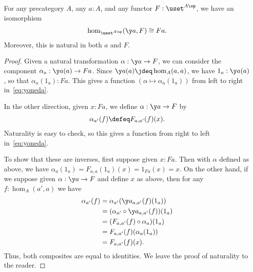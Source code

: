 %
\begin{thm}\label{ct:yoneda}
  For any precategory $A$, any $a:A$, and any functor $F:\uset^{A\op}$, we have an isomorphism
  \begin{equation}\label{eq:yoneda}
    \hom_{\uset^{A\op}}(\y a, F) \cong Fa.
  \end{equation}
  Moreover, this is natural in both $a$ and $F$.
\end{thm}

\begin{proof}
  Given a natural transformation $\alpha:\y a \to F$, we can consider the component $\alpha_a : \y a(a) \to F a$.
  Since $\y a(a)\jdeq \hom_A(a,a)$, we have $1_a : \y a(a)$, so that $\alpha_a(1_a) : F a$.
  This gives a function $(\alpha \mapsto \alpha_a(1_a))$ from left to right in~\eqref{eq:yoneda}.

  In the other direction, given $x:F a$, we define $\alpha:\y a \to F$ by
  \[\alpha_{a'}(f) \defeq F_{a,a'}(f)(x). \]
  Naturality is easy to check, so this gives a function from right to left in~\eqref{eq:yoneda}.

  To show that these are inverses, first suppose given $x:F a$.
  Then with $\alpha$ defined as above, we have $\alpha_a(1_a) = F_{a,a}(1_a)(x) = 1_{F a}(x) = x$.
  On the other hand, if we suppose given $\alpha:\y a \to F$ and define $x$ as above, then for any $f:\hom_A(a',a)$ we have
  \begin{align*}
    \alpha_{a'}(f)
    &= \alpha_{a'} (\y a_{a,a'}(f)(1_a))\\
    &= (\alpha_{a'}\circ \y a_{a,a'}(f))(1_a)\\
    &= (F_{a,a'}(f)\circ \alpha_a)(1_a)\\
    &= F_{a,a'}(f)(\alpha_a(1_a))\\
    &= F_{a,a'}(f)(x).
  \end{align*}
  Thus, both composites are equal to identities.
  We leave the proof of naturality to the reader.
\end{proof}
